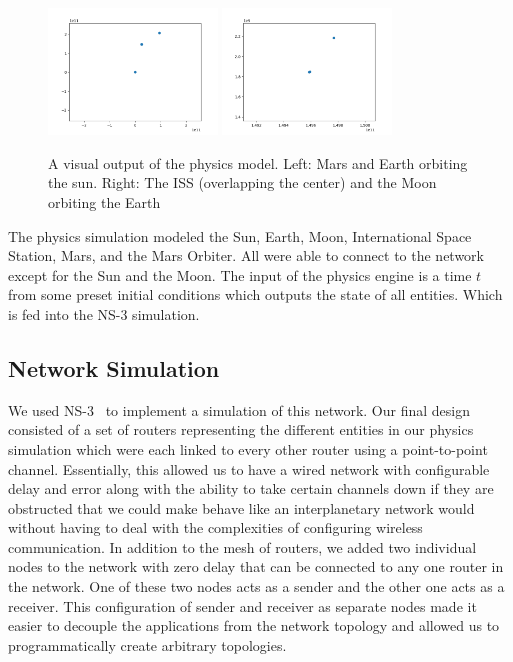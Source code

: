 \documentclass[a4paper,12pt]{article}
\begin{document}
\begin{figure}[h]
  \centering
  \includegraphics[width=0.4\textwidth]{media/sun_orbit.png}
  \includegraphics[width=0.4\textwidth]{media/moon_orbit.png}
  \caption{A visual output of the physics model. Left: Mars and Earth orbiting
    the sun. Right: The ISS (overlapping the center) and the Moon orbiting the
    Earth}
\end{figure}

The physics simulation modeled the Sun, Earth, Moon, International Space
Station, Mars, and the Mars Orbiter. All were able to connect to the network
except for the Sun and the Moon. The input of the physics engine is a time $t$
from some preset initial conditions which outputs the state of all entities.
Which is fed into the NS-3 simulation.

\subsection{Network Simulation}

We used NS-3~\cite{ns-3} to implement a simulation of this network. Our final
design consisted of a set of routers representing the different entities in our
physics simulation which were each linked to every other router using a
point-to-point channel. Essentially, this allowed us to have a wired network
with configurable delay and error along with the ability to take certain
channels down if they are obstructed that we could make behave like an
interplanetary network would without having to deal with the complexities of
configuring wireless communication. In addition to the mesh of routers, we added
two individual nodes to the network with zero delay that can be connected to any
one router in the network. One of these two nodes acts as a sender and the other
one acts as a receiver. This configuration of sender and receiver as separate
nodes made it easier to decouple the applications from the network topology and
allowed us to programmatically create arbitrary topologies.
\end{document}
